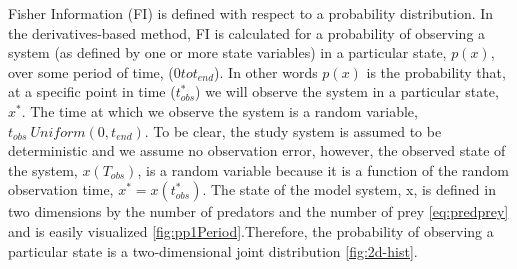 \documentclass[12pt,twoside,openany]{reedthesis}
\begin{document}
Fisher Information (FI) is defined with respect to a probability
distribution. In the derivatives-based method, FI is calculated for a
probability of observing a system (as defined by one or more state
variables) in a particular state, \(p(x)\), over some period of time,
(\(0 to t_{end}\)). In other words \(p(x)\) is the probability that, at
a specific point in time (\(t_{obs}^*\)) we will observe the system in a
particular state, \(x^*\). The time at which we observe the system is a
random variable, \(t_{obs} ~ Uniform(0,t_{end})\). To be clear, the
study system is assumed to be deterministic and we assume no observation
error, however, the observed state of the system, \(x(T_{obs})\), is a
random variable because it is a function of the random observation time,
\(x^*= x(t_{obs}^*)\). The state of the model system, x, is defined in
two dimensions by the number of predators and the number of prey
\eqref{eq:predprey} and is easily visualized
\ref{fig:pp1Period}.Therefore, the probability of observing a particular
state is a two-dimensional joint distribution \ref{fig:2d-hist}.
\end{document}
